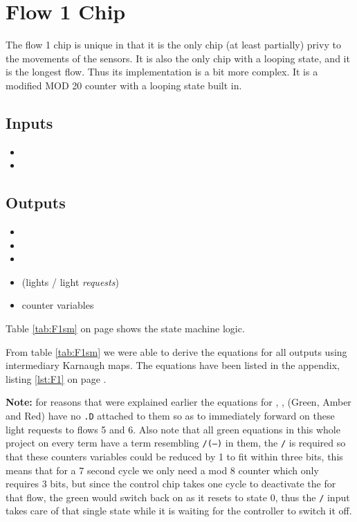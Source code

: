 \section{Flow 1 Chip}
The flow 1 chip is unique in that it is the only chip (at least partially)
privy to the movements of the sensors. It is also the only chip with a looping
state, and it is the longest flow. Thus its implementation is a bit more
complex. It is a modified MOD 20 counter with a looping state built in. 

\subsection{Inputs}
\begin{itemize}
  \item \nS
  \item \EN{}
\end{itemize}

\subsection{Outputs}
\begin{itemize}
  \item \FF
  \item \nGr
  \item \nAm
  \item \nRed (lights / light \emph{requests})
  \item \Q{[0\ldots4]} counter variables
\end{itemize}

Table \ref{tab:F1sm} on page \pageref{tab:F1sm} shows the state machine logic.

From table \ref{tab:F1sm} we were able to derive the equations for all
outputs using intermediary Karnaugh maps. The equations have been listed in the
appendix, listing \ref{lst:F1} on page \pageref{lst:F1}.

\textbf{Note:} for reasons that were explained earlier the equations for \nGr,
\nAm, \nRed(Green, Amber and Red) have no \texttt{.D} attached to them so as to
immediately forward on these light requests to flows 5 and 6. Also note that all
green equations in this whole project on every term have a term resembling
\texttt{/\nAm*\EN*(---)} in them, the \texttt{/\nAm} is required so that these
counters variables could be reduced by 1 to fit within three bits, this means
that for a 7 second cycle we only need a mod 8 counter which only requires
3 bits, but since the control chip takes one cycle to deactivate the \EN for
that flow, the green would switch back on as it resets to state 0, thus the
\texttt{/\nAm} input takes care of that single state while it is waiting for
the controller to switch it off. 